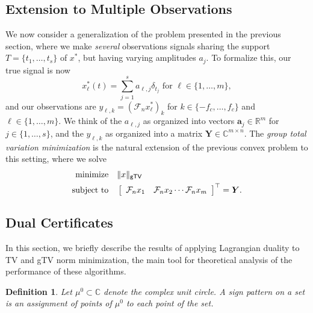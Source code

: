 \documentclass[11pt]{article}
\newcommand{\RR}{\mathbb{R}}
\newcommand{\CC}{\mathbb{C}}
\newcommand{\sF}{\mathcal{F}}
\newcommand{\HS}{\hspace{3.5mm}}
\newcommand{\bY}{\bm Y}
\newcommand{\ba}{\bm a}
\newtheorem{definition}{Definition}
\begin{document}
\subsection{Extension to Multiple Observations}

We now consider a generalization of the problem presented in the previous section, where we make \emph{several} observations signals sharing the support $T = \{t_1, \dots, t_s\}$ of $x^*$, but having varying amplitudes $a_j$.
To formalize this, our true signal is now
\begin{equation}
    x^*_\ell(t) = \sum_{j = 1}^s a_{\ell, j} \delta_{t_j} \text{ for } \ell \in \{1, \dots, m\},
\end{equation}
and our observations are $y_{\ell, k} = (\sF_n x^*_\ell)_{k}$ for $k \in \{-f_c, \dots, f_c\}$ and $\ell \in \{1, \dots, m\}$.
We think of the $a_{\ell, j}$ as organized into vectors $\ba_{j} \in \RR^m$ for $j \in \{1, \dots, s\}$, and the  $y_{\ell, k}$ as organized into a matrix $\bY \in \CC^{m \times n}$.
The \emph{group total variation minimization} is the natural extension of the previous convex problem to this setting, where we solve
\begin{equation}
\begin{aligned}
  \text{minimize} &\HS \|x\|_{\mathsf{gTV}} \\
  \text{subject to} &\HS \left[\begin{array}{cccc}\sF_nx_1 & \sF_n x_2 \cdots \sF_n x_m \end{array}\right]^\top = \bY.
\end{aligned}
\end{equation}

\subsection{Dual Certificates}

In this section, we briefly describe the results of applying Lagrangian duality to \textsf{TV} and \textsf{gTV} norm minimization, the main tool for theoretical analysis of the performance of these algorithms.

\begin{definition}
    Let $\mu^0 \subset \CC$ denote the complex unit circle.
    A \emph{sign pattern} on a set is an assignment of points of $\mu^0$ to each point of the set.
\end{definition}
\end{document}
